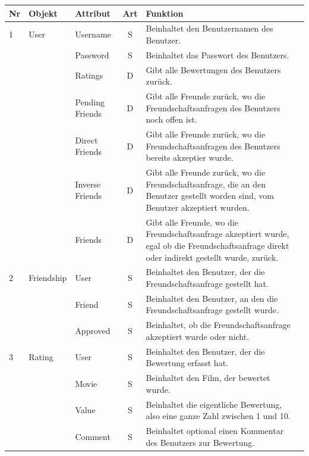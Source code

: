 \begin{table}[ht]
\begin{center}
    \begin{tabular}{lllcp{9cm}l}
        \toprule Nr & Objekt & Attribut & Art & Funktion \\
        \midrule
            1 & User & Username & S & Beinhaltet den Benutzernamen des Benutzer. \\
            & & Password & S & Beinhaltet das Passwort des Benutzers. \\
            & & Ratings & D & Gibt alle Bewertungen des Benutzers zurück. \\
            & & Pending Friends & D & Gibt alle Freunde zurück, wo die Freundschaftsanfragen
                                      des Benutzers noch offen ist. \\
            & & Direct Friends & D & Gibt alle Freunde zurück, wo die Freundschaftsanfragen
                                     des Benutzers bereits akzeptier wurde. \\
            & & Inverse Friends & D & Gibt alle Freunde zurück, wo die Freundschaftsanfrage,
                                      die an den Benutzer gestellt worden sind, vom Benutzer
                                      akzeptiert wurden. \\
            & & Friends & D & Gibt alle Freunde, wo die Freundschaftsanfrage akzeptiert wurde,
                              egal ob die Freundschaftsanfrage direkt oder indirekt gestellt
                              wurde, zurück. \\
        \midrule
            2 & Friendship & User & S & Beinhaltet den Benutzer, der die Freundschaftsanfrage
                                        gestellt hat. \\
            & & Friend & S & Beinhaltet den Benutzer, an den die Freundschaftsanfrage gestellt
                                        wurde. \\
            & & Approved & S & Beinhaltet, ob die Freundschaftsanfrage akzeptiert wurde oder nicht. \\
        \midrule
            3 & Rating & User & S & Beinhaltet den Benutzer, der die Bewertung erfasst hat. \\
            & & Movie & S & Beinhaltet den Film, der bewertet wurde. \\
            & & Value & S & Beinhaltet die eigentliche Bewertung, also eine ganze Zahl zwischen 1 und 10. \\
            & & Comment & S & Beinhaltet optional einen Kommentar des Benutzers zur Bewertung. \\

\end{tabular}
\end{center}
\end{table}
